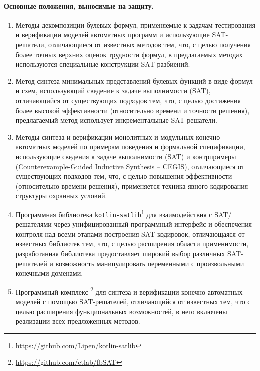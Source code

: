 %
%
\paragraph{Основные положения, выносимые на защиту.}
%
%
\begin{enumerate}[beginpenalty=10000]
    \item Методы декомпозиции булевых формул, применяемые к задачам тестирования и верификации моделей автоматных программ и использующие SAT-решатели, отличающиеся от известных методов тем, что, с целью получения более точных верхних оценок трудности формул, в предлагаемых методах используются специальные конструкции SAT-разбиений.

    \item Метод синтеза минимальных представлений булевых функций в виде формул и схем, использующий сведение к задаче выполнимости (SAT), отличающийся от существующих подходов тем, что, с целью достижения более высокой эффективности (относительно времени и точности решения), предлагаемый метод использует инкрементальные SAT-решатели.

    \item Методы синтеза и верификации монолитных и модульных конечно-автоматных моделей по примерам поведения и формальной спецификации, использующие сведения к задаче выполнимости (SAT) и контрпримеры (Counterexample-Guided Inductive Synthesis \--- CEGIS), отличающиеся от существующих подходов тем, что, с целью повышения эффективности (относительно времени решения), применяется техника явного кодирования структуры охранных условий.

    \item Программная библиотека \texttt{kotlin-satlib}\footnote{\url{https://github.com/Lipen/kotlin-satlib}} для взаимодействия с SAT\-/решателями через унифицированный программный интерфейс и обеспечения контроля над всеми этапами построения SAT-кодировок, отличающаяся от известных библиотек тем, что, с целью расширения области применимости, разработанная библиотека предоставляет широкий выбор различных SAT-решателей и возможность манипулировать переменными с произвольными конечными доменами.

    \item Программный комплекс \footnote{\url{https://github.com/ctlab/fbSAT}} для синтеза и верификации конечно-автоматных моделей с помощью SAT-решателей, отличающийся от известных тем, что с целью расширения функциональных возможностей, в
    него включены реализации всех предложенных методов.
\end{enumerate}


